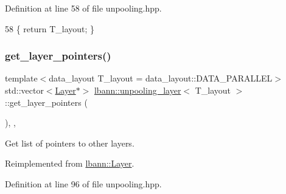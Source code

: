 Definition at line 58 of file unpooling.\+hpp.


\begin{DoxyCode}
58 \{ \textcolor{keywordflow}{return} T\_layout; \}
\end{DoxyCode}
\mbox{\label{classlbann_1_1unpooling__layer_a33e17164da27e3370fb3f362dd2e6c13}} 
\subsubsection{\texorpdfstring{get\+\_\+layer\+\_\+pointers()}{get\_layer\_pointers()}}
{\footnotesize\ttfamily template$<$data\+\_\+layout T\+\_\+layout = data\+\_\+layout\+::\+D\+A\+T\+A\+\_\+\+P\+A\+R\+A\+L\+L\+EL$>$ \\
std\+::vector$<$\hyperlink{classlbann_1_1Layer}{Layer}$\ast$$>$ \hyperlink{classlbann_1_1unpooling__layer}{lbann\+::unpooling\+\_\+layer}$<$ T\+\_\+layout $>$\+::get\+\_\+layer\+\_\+pointers (\begin{DoxyParamCaption}{ }\end{DoxyParamCaption})\hspace{0.3cm}{\ttfamily [inline]}, {\ttfamily [override]}, {\ttfamily [virtual]}}

Get list of pointers to other layers. 

Reimplemented from \hyperlink{classlbann_1_1Layer_a9f94210cbb973f1df89ef649899094a1}{lbann\+::\+Layer}.



Definition at line 96 of file unpooling.\+hpp.


